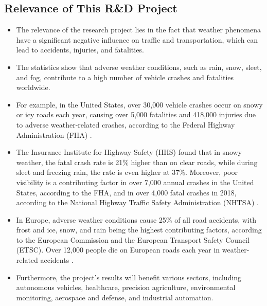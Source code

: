 \documentclass[rnd]{mas_proposal}
\begin{document}
\subsection{Relevance of This R\&D Project}
\begin{itemize}

    \item The relevance of the research project lies in the fact that weather phenomena have a significant negative influence on traffic and transportation, which can lead to accidents, injuries, and fatalities.
    
    \item The statistics show that adverse weather conditions, such as rain, snow, sleet, and fog, contribute to a high number of vehicle crashes and fatalities worldwide.
    
    \item For example, in the United States, over 30,000 vehicle crashes occur on snowy or icy roads each year, causing over 5,000 fatalities and 418,000 injuries due to adverse weather-related crashes, according to the Federal Highway Administration (FHA) \cite{federal-highway-administration-no-date} \cite{usDepartmentofCommerce2016}.
    
    \item The Insurance Institute for Highway Safety (IIHS) found that in snowy weather, the fatal crash rate is 21\% higher than on clear roads, while during sleet and freezing rain, the rate is even higher at 37\%. Moreover, poor visibility is a contributing factor in over 7,000 annual crashes in the United States, according to the FHA, and in over 4,000 fatal crashes in 2018, according to the National Highway Traffic Safety Administration (NHTSA) \cite{brumbelow2022light}.
    
    \item In Europe, adverse weather conditions cause 25\% of all road accidents, with frost and ice, snow, and rain being the highest contributing factors, according to the European Commission and the European Transport Safety Council (ETSC). Over 12,000 people die on European roads each year in weather-related accidents \cite{cookson-2022}.
    
    \item Furthermore, the project's results will benefit various sectors, including autonomous vehicles, healthcare, precision agriculture, environmental monitoring, aerospace and defense, and industrial automation.
    

\end{itemize}
\end{document}
